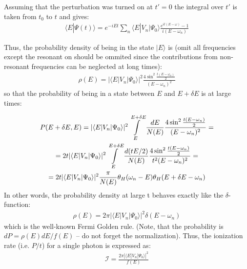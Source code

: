 Assuming that the perturbation was turned on at $ t'=0 $ the integral over $ t' $ is taken from $ t_{0} $ to $ t $ and gives:
\begin{gather}
	\langle E|\Psi(t)\rangle=e^{-iEt}\sum_{n}\langle E|V_{n}|\Psi_{0}\rangle\frac{e^{it(E-\omega)}-1}{i(E-\omega_{n})}
\end{gather}

Thus, the probability density of being in the state $ |E\rangle $ is (omit all frequencies except the resonant on should be ommited since the contributions from non-resonant frequencies can be neglected at long times):
\begin{gather}
	\rho(E)=|\langle E|V_{n}|\Psi_{0}\rangle|^{2}\frac{4\sin^{2}\frac{t(E-\omega_{n})}{2}}{(E-\omega_{n})^{2}}
\end{gather}
so that the probability of being in a state between $ E $ and $ E+\delta E $ is at large times:

\begin{multline}
	P(E+\delta E,E)=|\langle E|V_{n}|\Psi_{0}\rangle|^{2}\intop_{E}^{E+\delta E}\frac{dE}{N(E)}\frac{4\sin^{2}\frac{t(E-\omega_{n})}{2}}{(E-\omega_{n})^{2}}=\\=2t|\langle E|V_{n}|\Psi_{0}\rangle|^{2}\intop_{E}^{E+\delta E}\frac{d(tE/2)}{N(E)}\frac{4\sin^{2}\frac{t(E-\omega_{n})}{2}}{t^{2}(E-\omega_{n})^{2}}=\\=2t|\langle E|V_{n}|\Psi_{0}\rangle|^{2}\frac{\pi}{N(E)}\theta_{H}(\omega_{n}-E)\theta_{H}(E+\delta E-\omega_{n})
\end{multline}
In other words, the probability density at large t behaves exactly like the $ \delta $-function:
\begin{gather}
	\rho(E)=2\pi|\langle E|V_{n}|\Psi_{0}\rangle|^{2}\delta(E-\omega_{n})
\end{gather} 
which is the well-known Fermi Golden rule. (Note, that the probability is $ dP=\rho(E)dE/f(E) $ – do not forget the normalization). Thus, the ionization rate (i.e. $ P/t $) for a single photon is expressed as:
\begin{gather}
\label{golden_reul_first_order}
	\mathcal{I}=\frac{2\pi|\langle E|V_{n}|\Psi_{0}\rangle|^{2}}{f(E)}
\end{gather}
